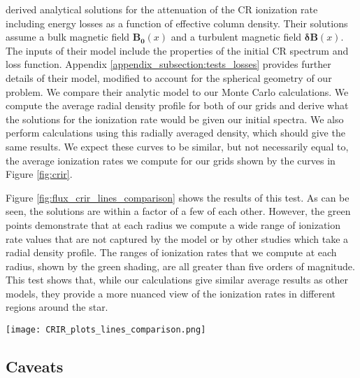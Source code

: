 \documentclass[twocolumn]{aastex63}
\begin{document}
\cite{silsbee_2019_model} derived analytical solutions for the attenuation of the CR ionization rate including energy losses as a function of effective column density. Their solutions assume a bulk magnetic field $\boldsymbol{B_0}(x)$ and a turbulent magnetic field $\boldsymbol{\delta B}(x)$. The inputs of their model include the properties of the initial CR spectrum and loss function. Appendix \ref{appendix_subsection:tests_losses} provides further details of their model, modified to account for the spherical geometry of our problem.
We compare their analytic model to our Monte Carlo calculations. We compute the average radial density profile for both of our grids and derive what the \cite{silsbee_2019_model} solutions for the ionization rate would be given our initial spectra. We also perform calculations using this radially averaged density, which should give the same results. We expect these curves to be similar, but not necessarily equal to, the average ionization rates we compute for our grids shown by the curves in Figure \ref{fig:crir}.  

Figure \ref{fig:flux_crir_lines_comparison} shows the results of this test. As can be seen, the solutions are within a factor of a few of each other. However, the green points demonstrate that at each radius we compute a wide range of ionization rate values that are not captured by the \cite{silsbee_2019_model} model or by other studies which take a radial density profile. The ranges of ionization rates that we compute at each radius, shown by the green shading, are all greater than five orders of magnitude. This test shows that, while our calculations give similar average results as other models, they provide a more nuanced view of the ionization rates in different regions around the star.

\begin{figure*}
\centering
\texttt{[image: CRIR\_plots\_lines\_comparison.png]}
\caption{
Average ionization rate as a function of radius for $t=0.3$ Myr and $t=0.5$ Myr. Dark blue curves use the densities in our grids. Light blue curves show numerical results using the radially averaged density profile in each grid. Black curves show the \cite{silsbee_2019_model} model solutions using this density profile and our input loss function and CR spectra. Green points show the maximum and minimum values of any angular bin at a given radius.
}
\label{fig:flux_crir_lines_comparison}
\end{figure*}

\subsection{Caveats}
\label{subsection:caveats}
\end{document}
